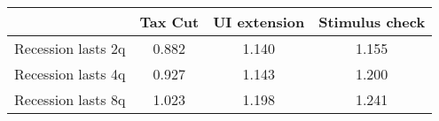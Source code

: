 \begin{tabular}{@{}lccc@{}} 
\toprule 
& Tax Cut    & UI extension    & Stimulus check    \\  \midrule 
Recession lasts 2q &0.882  & 1.140  & 1.155     \\ 
Recession lasts 4q &0.927  & 1.143  & 1.200     \\ 
Recession lasts 8q &1.023  & 1.198  & 1.241     \\ 
\end{tabular}  
